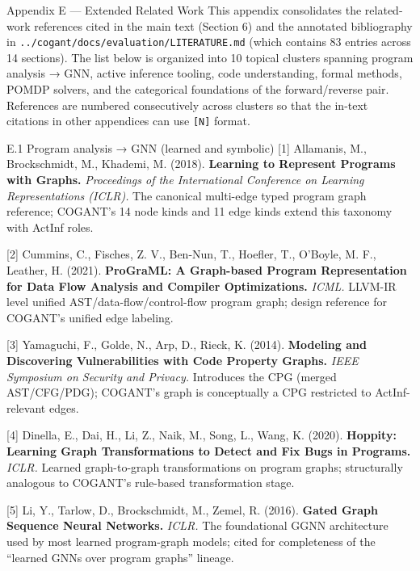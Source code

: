 \documentclass[
  ignorenonframetext,
]{beamer}
\author{\texorpdfstring{}{}}
\date{}
\begin{document}
\begin{frame}[fragile]{Appendix E --- Extended Related Work}
\protect{}\label{appendix-e-extended-related-work}
This appendix consolidates the related-work references cited in the main
text (Section 6) and the annotated bibliography in
\texttt{../cogant/docs/evaluation/LITERATURE.md} (which contains 83
entries across 14 sections). The list below is organized into 10 topical
clusters spanning program analysis → GNN, active inference tooling, code
understanding, formal methods, POMDP solvers, and the categorical
foundations of the forward/reverse pair. References are numbered
consecutively across clusters so that the in-text citations in other
appendices can use \texttt{{[}N{]}} format.

\begin{block}{E.1 Program analysis → GNN (learned and symbolic)}
\protect{}\label{e.1-program-analysis-gnn-learned-and-symbolic}
{[}1{]} Allamanis, M., Brockschmidt, M., Khademi, M. (2018).
\textbf{Learning to Represent Programs with Graphs.} \emph{Proceedings
of the International Conference on Learning Representations (ICLR).} The
canonical multi-edge typed program graph reference; COGANT's 14 node
kinds and 11 edge kinds extend this taxonomy with ActInf roles.

{[}2{]} Cummins, C., Fisches, Z. V., Ben-Nun, T., Hoefler, T., O'Boyle,
M. F., Leather, H. (2021). \textbf{ProGraML: A Graph-based Program
Representation for Data Flow Analysis and Compiler Optimizations.}
\emph{ICML.} LLVM-IR level unified AST/data-flow/control-flow program
graph; design reference for COGANT's unified edge labeling.

{[}3{]} Yamaguchi, F., Golde, N., Arp, D., Rieck, K. (2014).
\textbf{Modeling and Discovering Vulnerabilities with Code Property
Graphs.} \emph{IEEE Symposium on Security and Privacy.} Introduces the
CPG (merged AST/CFG/PDG); COGANT's graph is conceptually a CPG
restricted to ActInf-relevant edges.

{[}4{]} Dinella, E., Dai, H., Li, Z., Naik, M., Song, L., Wang, K.
(2020). \textbf{Hoppity: Learning Graph Transformations to Detect and
Fix Bugs in Programs.} \emph{ICLR.} Learned graph-to-graph
transformations on program graphs; structurally analogous to COGANT's
rule-based transformation stage.

{[}5{]} Li, Y., Tarlow, D., Brockschmidt, M., Zemel, R. (2016).
\textbf{Gated Graph Sequence Neural Networks.} \emph{ICLR.} The
foundational GGNN architecture used by most learned program-graph
models; cited for completeness of the ``learned GNNs over program
graphs'' lineage.


\end{block}
\end{frame}
\end{document}
